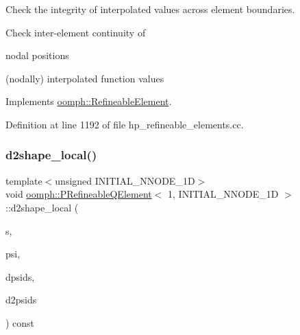Check the integrity of interpolated values across element boundaries. 

Check inter-\/element continuity of
\begin{DoxyItemize}
\item nodal positions
\item (nodally) interpolated function values 
\end{DoxyItemize}

Implements \hyperlink{classoomph_1_1RefineableElement_ae665f2d2eb0b6410ddcb101caa80922a}{oomph\+::\+Refineable\+Element}.



Definition at line 1192 of file hp\+\_\+refineable\+\_\+elements.\+cc.

\mbox{\label{classoomph_1_1PRefineableQElement_3_011_00_01INITIAL__NNODE__1D_01_4_a4672dbd02067a8087a4a2e2c0188f8ec}} 
\subsubsection{\texorpdfstring{d2shape\+\_\+local()}{d2shape\_local()}}
{\footnotesize\ttfamily template$<$unsigned I\+N\+I\+T\+I\+A\+L\+\_\+\+N\+N\+O\+D\+E\+\_\+1D$>$ \\
void \hyperlink{classoomph_1_1PRefineableQElement}{oomph\+::\+P\+Refineable\+Q\+Element}$<$ 1, I\+N\+I\+T\+I\+A\+L\+\_\+\+N\+N\+O\+D\+E\+\_\+1D $>$\+::d2shape\+\_\+local (\begin{DoxyParamCaption}\item[{const \hyperlink{classoomph_1_1Vector}{Vector}$<$ double $>$ \&}]{s,  }\item[{\hyperlink{classoomph_1_1Shape}{Shape} \&}]{psi,  }\item[{\hyperlink{classoomph_1_1DShape}{D\+Shape} \&}]{dpsids,  }\item[{\hyperlink{classoomph_1_1DShape}{D\+Shape} \&}]{d2psids }\end{DoxyParamCaption}) const\hspace{0.3cm}{\ttfamily [virtual]}}


